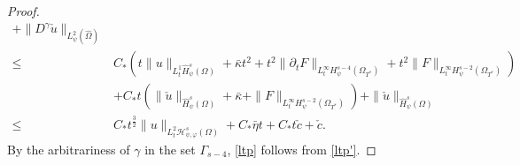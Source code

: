 \documentclass{amsart}
\numberwithin{equation}{section}
\begin{document}
\begin{proof}
\begin{align}
     +\|D^{\gamma}\check{u}\|_{L_{\psi}^{2}(\hat{\Omega})}\\
\leq& C_{*}\left(t\|u\|_{L_{t}^{1}\hat{H}_{\psi}^{s}(\Omega)}+\bar{\kappa}t^{2}
                 +t^{2}\|\partial_{t}F\|_{L_{t}^{\infty}H_{\psi}^{s-4}(\Omega_{T^{*}})}
                 +t^{2}\|F\|_{L_{t}^{\infty}H_{\psi}^{s-2}(\Omega_{T^{*}})}\right)\nonumber\\
    &+C_{*}t(\|\check{u}\|_{\hat{H}_{\psi}^{s}(\Omega)}+\bar{\kappa}+\|{F}\|_{L_{t}^{\infty}H_{\psi}^{s-2}(\Omega_{T^{*}})})
     +\|\check{u}\|_{\hat{H}_{\psi}^{s}(\Omega)}\nonumber\\
\leq& C_{*}t^{\frac{3}{2}}\|u\|_{L_{t}^{2}\mathcal{H}_{\psi,\varphi}^{s}(\Omega)}
     +C_{*}\bar{\eta}t
     +C_{*}t\check{c}
     +\check{c}.\nonumber
\end{align}
By the arbitrariness of $\gamma$ in the set $\Gamma_{s-4}$, \eqref{ltp} follows from \eqref{ltp'}.


\end{proof}
\end{document}
